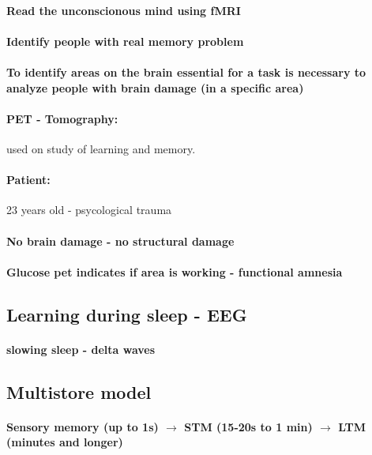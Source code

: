 \documentclass[12pt,article,oneside,a4paper]{memoir}
\begin{document}
\paragraph{Read the unconscionous mind using fMRI}
\paragraph{Identify people with real memory problem}

\paragraph{To identify areas on the brain essential for a task is necessary to analyze people with brain damage (in a specific area)}

\paragraph{PET - Tomography:} used on study of learning and memory.
\paragraph{Patient:} 23 years old - psycological trauma
\paragraph{No brain damage - no structural damage}
\paragraph{Glucose pet indicates if area is working - functional amnesia}

\subsection{Learning during sleep - EEG}
\paragraph{slowing sleep - delta waves}

\subsection{Multistore model}
\paragraph{Sensory memory (up to 1s) $\rightarrow$ STM (15-20s to 1 min) $\rightarrow$ LTM (minutes and longer)}
\end{document}
